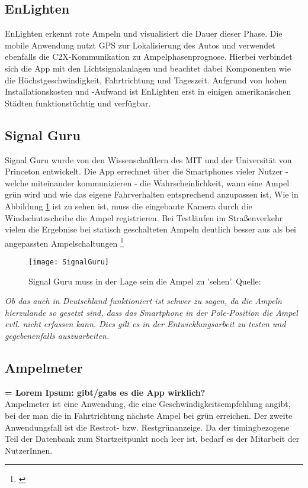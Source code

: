 \subsection{EnLighten}
EnLighten erkennt rote Ampeln und visualisiert die Dauer dieser Phase. Die mobile Anwendung nutzt \gls{GPS} zur Lokalisierung des Autos und verwendet ebenfalls die \gls{C2X}-Kommunikation zu Ampelphasenprognose. Hierbei verbindet sich die App mit den Lichtsignalanlagen und beachtet dabei Komponenten wie die Höchstgeschwindigkeit, Fahrtrichtung und Tageszeit. Aufgrund von hohen Installationskosten und -Aufwand ist EnLighten erst in einigen amerikanischen Städten funktionstüchtig und verfügbar.
\subsection{Signal Guru}
Signal Guru wurde von den Wissenschaftlern des \gls{MIT} und der Universität von Princeton entwickelt. Die App errechnet über die Smartphones vieler Nutzer - welche miteinander kommunizieren -  die Wahrscheinlichkeit, wann eine Ampel grün wird und wie das eigene Fahrverhalten entsprechend anzupassen ist. Wie in Abbildung \ref{fig:AppSignalGuru} ist zu sehen ist, muss die eingebaute Kamera durch die Windschutzscheibe die Ampel registrieren. Bei Testläufen im Straßenverkehr vielen die Ergebnise bei statisch geschalteten Ampeln deutlich besser aus als bei angepassten Ampelschaltungen \footnote{\cite{SignalGuru}} 
\begin{figure}[H]
    \centering
    \texttt{[image: SignalGuru]}
    \caption[Signal Guru]{Signal Guru muss in der Lage sein die Ampel zu 'sehen'.  Quelle: \cite{SignalGuruPaper}} \label{fig:AppSignalGuru}
\end{figure}
\textit{Ob das auch in Deutschland funktioniert ist schwer zu sagen, da die Ampeln hierzulande so gesetzt sind, dass das Smartphone in der Pole-Position die Ampel evtl. nicht erfassen kann. Dies gilt es in der Entwicklungsarbeit zu testen und gegebenenfalls auszuarbeiten.}
\subsection{Ampelmeter}
\textbf{= Lorem Ipsum: gibt/gabs es die App wirklich? \\}
Ampelmeter ist eine Anwendung, die eine Geschwindigkeitsempfehlung angibt, bei der man die in Fahrtrichtung nächste Ampel bei grün erreichen. Der zweite Anwendungsfall ist die Restrot- bzw. Restgrünanzeige. Da der timingbezogene Teil der Datenbank zum Startzeitpunkt noch leer ist, bedarf es der Mitarbeit der NutzerInnen.
